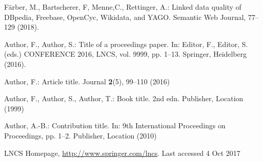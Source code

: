 \documentclass[runningheads]{llncs}
\begin{document}
\begin{thebibliography}{8}
F{\"a}rber, M., Bartscherer, F, Menne,C., Rettinger, A.: Linked data quality of DBpedia, Freebase, OpenCyc, Wikidata, and YAGO. Semantic Web Journal, 77--129 (2018). 

Author, F., Author, S.: Title of a proceedings paper. In: Editor,
F., Editor, S. (eds.) CONFERENCE 2016, LNCS, vol. 9999, pp. 1--13.
Springer, Heidelberg (2016). 

Author, F.: Article title. Journal \textbf{2}(5), 99--110 (2016)

Author, F., Author, S., Author, T.: Book title. 2nd edn. Publisher,
Location (1999)

Author, A.-B.: Contribution title. In: 9th International Proceedings
on Proceedings, pp. 1--2. Publisher, Location (2010)

LNCS Homepage, \url{http://www.springer.com/lncs}. Last accessed 4
Oct 2017
\end{thebibliography}
\end{document}
